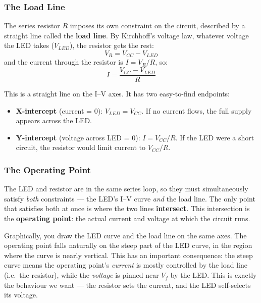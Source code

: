 \documentclass[11pt,letterpaper]{article}
\newcommand{\Vf}{V_f}
\newcommand{\Vcc}{V_{CC}}
\begin{document}
\subsubsection*{The Load Line}

The series resistor $R$ imposes its own constraint on the circuit, described by
a straight line called the \textbf{load line}. By Kirchhoff's voltage law, whatever
voltage the LED takes ($V_{LED}$), the resistor gets the rest:
\[ V_R = \Vcc - V_{LED} \]
and the current through the resistor is $I = V_R / R$, so:
\[ I = \frac{\Vcc - V_{LED}}{R} \]

This is a straight line on the I--V axes. It has two easy-to-find endpoints:
\begin{itemize}[leftmargin=2em]
	\item \textbf{X-intercept} (current = 0): $V_{LED} = \Vcc$.
	If no current flows, the full supply appears across the LED.
	\item \textbf{Y-intercept} (voltage across LED = 0): $I = \Vcc / R$.
	If the LED were a short circuit, the resistor would limit current to $\Vcc/R$.
\end{itemize}

\subsubsection*{The Operating Point}

The LED and resistor are in the same series loop, so they must simultaneously satisfy
\emph{both} constraints --- the LED's I--V curve \emph{and} the load line. The only
point that satisfies both at once is where the two lines \textbf{intersect}.
This intersection is the \textbf{operating point}: the actual current and voltage
at which the circuit runs.

Graphically, you draw the LED curve and the load line on the same axes. The operating
point falls naturally on the steep part of the LED curve, in the region where
the curve is nearly vertical. This has an important consequence: the steep curve
means the operating point's \emph{current} is mostly controlled by the load line
(i.e.\ the resistor), while the \emph{voltage} is pinned near $\Vf$ by the LED.
This is exactly the behaviour we want --- the resistor sets the current, and the LED
self-selects its voltage.
\end{document}
